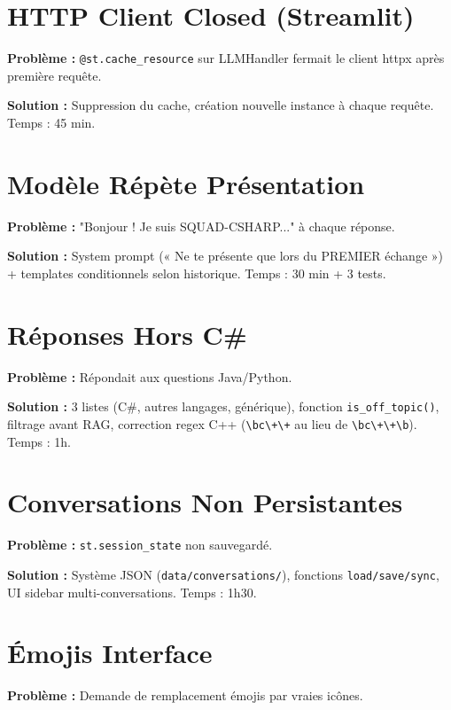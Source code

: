 \documentclass[12pt,a4paper]{report}
\begin{document}
\section{HTTP Client Closed (Streamlit)}

\textbf{Problème :} \texttt{@st.cache\_resource} sur LLMHandler fermait le client httpx après première requête.

\textbf{Solution :} Suppression du cache, création nouvelle instance à chaque requête. Temps : 45 min.

\section{Modèle Répète Présentation}

\textbf{Problème :} "Bonjour ! Je suis SQUAD-CSHARP..." à chaque réponse.

\textbf{Solution :} System prompt (« Ne te présente que lors du PREMIER échange ») + templates conditionnels selon historique. Temps : 30 min + 3 tests.

\section{Réponses Hors C\#}

\textbf{Problème :} Répondait aux questions Java/Python.

\textbf{Solution :} 3 listes (C\#, autres langages, générique), fonction \texttt{is\_off\_topic()}, filtrage avant RAG, correction regex C++ (\texttt{\textbackslash bc\textbackslash +\textbackslash +} au lieu de \texttt{\textbackslash bc\textbackslash +\textbackslash +\textbackslash b}). Temps : 1h.

\section{Conversations Non Persistantes}

\textbf{Problème :} \texttt{st.session\_state} non sauvegardé.

\textbf{Solution :} Système JSON (\texttt{data/conversations/}), fonctions \texttt{load/save/sync}, UI sidebar multi-conversations. Temps : 1h30.

\section{Émojis Interface}

\textbf{Problème :} Demande de remplacement émojis par vraies icônes.
\end{document}
